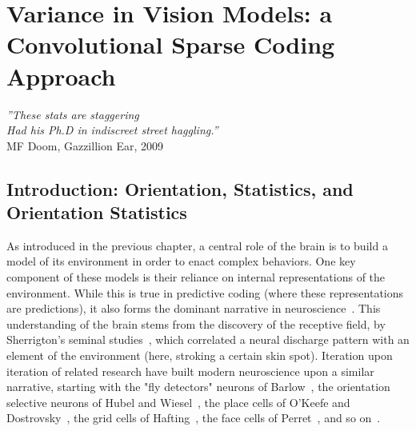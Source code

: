 \chapter{Variance in Vision Models: a Convolutional Sparse Coding Approach}

\begin{flushright}
    \textit{''These stats are staggering \\
    Had his Ph.D in indiscreet street haggling.''} \\
    MF Doom, Gazzillion Ear, 2009

\end{flushright}


\chaptertoc{}

\section{Introduction: Orientation, Statistics, and Orientation Statistics}
As introduced in the previous chapter, a central role of the brain is to build a model of its environment in order to enact complex behaviors. One key component of these models is their reliance on internal representations of the environment. While this is true in predictive coding (where these representations are predictions), it also forms the dominant narrative in neuroscience~\cite{keller2018predictive}. This understanding of the brain stems from the discovery of the receptive field, by Sherrigton's seminal studies~\cite{sherrington1906observations}, which correlated a neural discharge pattern with an element of the environment (here, stroking a certain skin spot). Iteration upon iteration of related research have built modern neuroscience upon a similar narrative, starting with the "fly detectors" neurons of Barlow~\cite{barlow1956retinal}, the orientation selective neurons of Hubel and Wiesel~\cite{hubel1959receptive}, the place cells of O'Keefe and Dostrovsky~\cite{o1971hippocampus}, the grid cells of Hafting~\cite{hafting2005microstructure}, the face cells of Perret~\cite{perrett1982visual}, and so on~\cite{martin1994brief}. 

